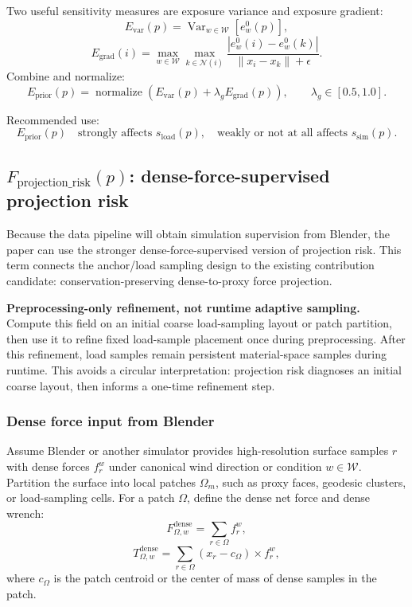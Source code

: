 \documentclass[11pt,a4paper]{article}
\newcommand{\normalize}{\operatorname{normalize}}
\newcommand{\Var}{\operatorname{Var}}
\begin{document}
Two useful sensitivity measures are exposure variance and exposure gradient:
\[
E_{\mathrm{var}}(p)=\Var_{w\in\mathcal{W}}[e_w^0(p)],
\]
\[
E_{\mathrm{grad}}(i)=
\max_{w\in\mathcal{W}}\max_{k\in\mathcal{N}(i)}
\frac{|e_w^0(i)-e_w^0(k)|}{\|x_i-x_k\|+\epsilon}.
\]
Combine and normalize:
\[
E_{\mathrm{prior}}(p)=
\normalize\left(E_{\mathrm{var}}(p)+\lambda_gE_{\mathrm{grad}}(p)\right),
\qquad \lambda_g\in[0.5,1.0].
\]

Recommended use:
\[
E_{\mathrm{prior}}(p)\quad\text{strongly affects }s_{\mathrm{load}}(p),\quad\text{weakly or not at all affects }s_{\mathrm{sim}}(p).
\]


\subsection{$F_{\mathrm{projection\_risk}}(p)$: dense-force-supervised projection risk}

Because the data pipeline will obtain simulation supervision from Blender, the paper can use the stronger dense-force-supervised version of projection risk. This term connects the anchor/load sampling design to the existing contribution candidate: conservation-preserving dense-to-proxy force projection.

\textbf{Preprocessing-only refinement, not runtime adaptive sampling.} Compute this field on an initial coarse load-sampling layout or patch partition, then use it to refine fixed load-sample placement once during preprocessing. After this refinement, load samples remain persistent material-space samples during runtime. This avoids a circular interpretation: projection risk diagnoses an initial coarse layout, then informs a one-time refinement step.

\subsubsection{Dense force input from Blender}
Assume Blender or another simulator provides high-resolution surface samples $r$ with dense forces $f_r^w$ under canonical wind direction or condition $w\in\mathcal{W}$. Partition the surface into local patches $\Omega_m$, such as proxy faces, geodesic clusters, or load-sampling cells. For a patch $\Omega$, define the dense net force and dense wrench:
\[
F_{\Omega,w}^{\mathrm{dense}}=\sum_{r\in\Omega} f_r^w,
\]
\[
T_{\Omega,w}^{\mathrm{dense}}=\sum_{r\in\Omega}(x_r-c_\Omega)\times f_r^w,
\]
where $c_\Omega$ is the patch centroid or the center of mass of dense samples in the patch.
\end{document}
